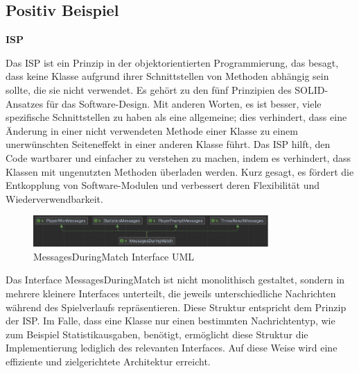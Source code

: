 \subsection{Positiv Beispiel}
\textbf{\acf{ISP}}\\
\begin{defStrich}
    Das \acf{ISP} ist ein Prinzip in der objektorientierten Programmierung, das besagt, dass keine Klasse aufgrund ihrer Schnittstellen von Methoden abhängig sein sollte, die sie nicht verwendet. Es gehört zu den fünf Prinzipien des SOLID-Ansatzes für das Software-Design. Mit anderen Worten, es ist besser, viele spezifische Schnittstellen zu haben als eine allgemeine; dies verhindert, dass eine Änderung in einer nicht verwendeten Methode einer Klasse zu einem unerwünschten Seiteneffekt in einer anderen Klasse führt. Das ISP hilft, den Code wartbarer und einfacher zu verstehen zu machen, indem es verhindert, dass Klassen mit ungenutzten Methoden überladen werden. Kurz gesagt, es fördert die Entkopplung von Software-Modulen und verbessert deren Flexibilität und Wiederverwendbarkeit.
\end{defStrich}
\begin{figure}[ht]
    \centering
    \includegraphics[width=0.8\textwidth]{Bilder/messagesDuringMatchUML.png}
    \caption{MessagesDuringMatch Interface UML}
    \label{fig:messagesDuringMatch-uml}
\end{figure}
Das Interface MessagesDuringMatch ist nicht monolithisch gestaltet, sondern in mehrere kleinere Interfaces unterteilt, die jeweils unterschiedliche Nachrichten während des Spielverlaufs repräsentieren. Diese Struktur entspricht dem Prinzip der \acf{ISP}. Im Falle, dass eine Klasse nur einen bestimmten Nachrichtentyp, wie zum Beispiel Statistikausgaben, benötigt, ermöglicht diese Struktur die Implementierung lediglich des relevanten Interfaces. Auf diese Weise wird eine effiziente und zielgerichtete Architektur erreicht.\newpage

